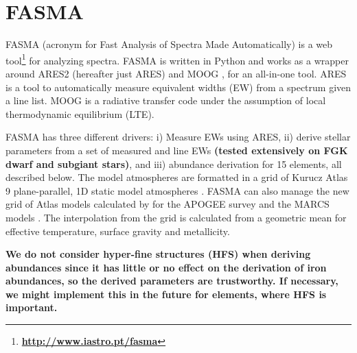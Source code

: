\documentclass{aa}
\begin{document}
\section{FASMA}
\label{sec:FASMA}
FASMA (acronym for Fast Analysis of Spectra Made Automatically) is a web
tool\footnote{\bf \url{http://www.iastro.pt/fasma}} for analyzing
spectra. FASMA is written in Python and works as a wrapper around ARES2
\citep{Sousa2015a} (hereafter just ARES) and MOOG
\citep[][version 2014]{Sneden1973}, for an all-in-one tool. ARES is a tool to
automatically measure equivalent widths (EW) from a spectrum given a line list.
MOOG is a radiative transfer code under the assumption of local thermodynamic
equilibrium (LTE).

FASMA has three different drivers: i) Measure EWs using ARES, ii) derive stellar
parameters from a set of measured  and  line EWs {\bf
(tested extensively on FGK dwarf and subgiant stars)}, and iii) abundance
derivation for 15 elements, all described below. The model atmospheres are
formatted in a grid of Kurucz Atlas 9 plane-parallel, 1D static model
atmospheres \citet{Kurucz1993}. FASMA can also manage the new grid of Atlas
models calculated by \citet{Meszaros2012} for the APOGEE survey and the MARCS
models \citep{Gustafson2008}. The interpolation from the grid is calculated from
a geometric mean for effective temperature, surface gravity and metallicity.

{\bf We do not consider hyper-fine structures (HFS) when deriving abundances
since it has little or no effect on the derivation of iron abundances, so the
derived parameters are trustworthy. If necessary, we might implement this in the
future for elements, where HFS is important.}
\end{document}
